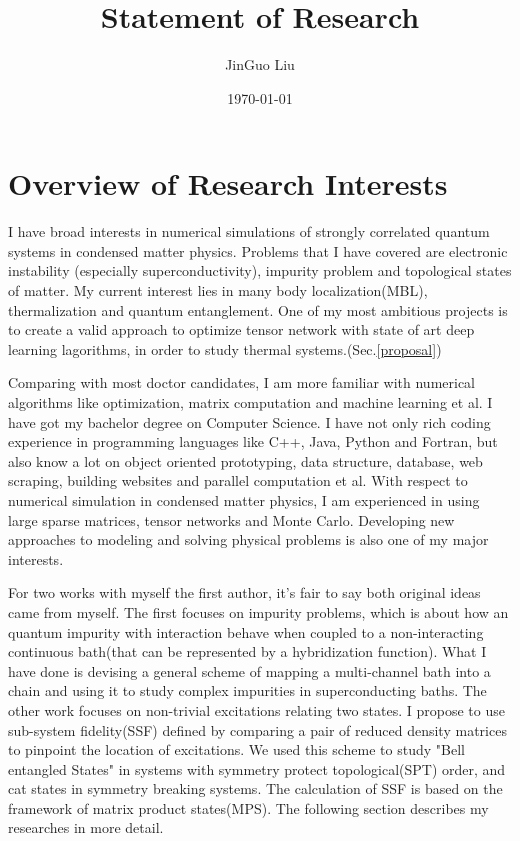 \documentclass[a4paper]{article}
\title{Statement of Research}
\author{JinGuo Liu}
\date{\today}
\newcommand{\<}{\langle}
\renewcommand{\>}{\rangle}
\begin{document}
\fontsize{10}{13}
\selectfont
\maketitle

\section{Overview of Research Interests}
I have broad interests in numerical simulations of strongly correlated quantum systems in condensed matter physics.
Problems that I have covered are electronic instability (especially superconductivity)\cite{Liu2014}, impurity problem\cite{Liu2016a} and topological states of matter\cite{Liu2016b}.
My current interest lies in many body localization(MBL), thermalization and quantum entanglement.
One of my most ambitious projects is to create a valid approach to optimize tensor network with state of art deep learning lagorithms, in order to study thermal systems.(Sec.\ref{proposal})

Comparing with most doctor candidates, I am more familiar with numerical algorithms like optimization, matrix computation and machine learning et al.
I have got my bachelor degree on Computer Science. I have not only rich coding experience in programming languages like C++, Java, Python and Fortran,
but also know a lot on object oriented prototyping, data structure, database, web scraping, building websites and parallel computation et al.
With respect to numerical simulation in condensed matter physics,
I am experienced in using large sparse matrices, tensor networks and Monte Carlo.
Developing new approaches to modeling and solving physical problems is also one of my major interests.

For two works with myself the first author, it's fair to say both original ideas came from myself.
The first focuses on impurity problems, which is about how an quantum impurity with interaction behave when coupled to a non-interacting continuous bath(that can be represented by a hybridization function).
What I have done is devising a general scheme of mapping a multi-channel bath into a chain and using it to study complex impurities in superconducting baths.
The other work focuses on non-trivial excitations relating two states.
I propose to use sub-system fidelity(SSF) defined by comparing a pair of reduced density matrices to pinpoint the location of excitations.
We used this scheme to study "Bell entangled States" in systems with symmetry protect topological(SPT) order, and cat states in symmetry breaking systems.
The calculation of SSF is based on the framework of matrix product states(MPS).
The following section describes my researches in more detail.
\end{document}
